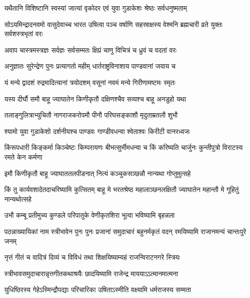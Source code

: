 \twolineshloka
{यथैतानि विशिष्टानि स्वस्यां जात्यां वृकोदर}
{एवं युवा गुडाकेशः श्रेष्ठः सर्वधनुष्मताम्}


\threelineshloka
{सोऽयमिन्द्रादनवमो वासुदेवाच्च भारत}
{उषित्वा पञ्च वर्षाणि सहस्राक्षस्य वेश्मनि}
{ब्रह्मचारी व्रते युक्तः सर्वशस्त्रभृतां वरः}


\twolineshloka
{अवाप चास्त्रमस्त्रज्ञः सर्वज्ञः सर्वसम्मतः}
{क्षिप्रं चाणु विचित्रं च ध्रुवं च वदतां वरः}


\twolineshloka
{अनुज्ञातः सुरेन्द्रेण पुनः प्रत्यागतो महीम्}
{धार्तराष्ट्रविनाशाय पाण्डवानां जयाय च}


\twolineshloka
{यं मन्ये द्वादशं रुद्रमादित्यानां त्रयोदशम्}
{वसूनां नवमं मन्ये गिरीणामष्टमः स्मृतः}


\twolineshloka
{यस्य दीर्घौ समौ बाहू ज्याघातेन किणीकृतौ}
{दक्षिणश्चैव सव्यश्च बाहू अनडुहो यथा}



\twolineshloka
{तलाङ्गुलित्राभ्युचितौ नागराजकरोपमौ}
{पीनौ परिघसङ्काशौ मृदुताम्रतलौ शुभौ}


\twolineshloka
{श्यामो युवा गुडाकेशो दर्शनीयश्च पाण्डवः}
{गाण्डीवधन्वा श्वेताश्वः किरीटी वानरध्वजः}


\threelineshloka
{किंरूपधारी किङ्कर्मा किञ्चेष्टः किम्परायणः}
{बीभत्सुर्भीमधन्वा च किं करिष्यति चार्जुनः}
{कुन्तीपुत्रो विराटस्य रमते केन कर्मणा}




\twolineshloka
{इमौ किणीकृतौ बाहू ज्याघाततलपीडनात्}
{नित्यं कञ्चुकसञ्छन्नौ नान्यथा गोप्तुमुत्सहे}


\onelineshloka
{किं तु कार्यवशादेतदाचरिष्यामि कुत्सितम्}
\twolineshloka
{बाहू मे भरतश्रेष्ठ महालाञ्छनलक्षितौ}
{ज्याघातेन महान्तौ मे गूहितुं नान्यथोत्सहे}


\twolineshloka
{उभौ कम्बू प्रतीमुच्य कुण्डले परिपातुके}
{वेणीकृतशिरा भूत्वा भविष्यामि बृहन्नला}


\threelineshloka
{पठन्नाख्यायिकां नाम स्त्रीभावेन पुनः पुनः}
{प्रजानां समुदाचारं बहुनर्मकृतं वदन्}
{रमयिष्यामि राजानमन्यं चान्तःपुरे जनम्}


\twolineshloka
{नृत्तं गीतं च वादित्रं दिव्यं च विविधं तथा}
{शिक्षयिष्याम्यहं राजन्विराटनगरे स्त्रियः}


\twolineshloka
{स्त्रीभावसमुदाचारान्नृत्तगीतकथाश्रयैः}
{छादयिष्यामि राजेन्द्र माययाऽऽत्मानमात्मना}


\twolineshloka
{युधिष्ठिरस्य गेहेऽस्मिन्द्रौपद्याः परिचारिका}
{उषिताऽस्मीति वक्ष्यामि धर्मराजस्य सम्मता}


